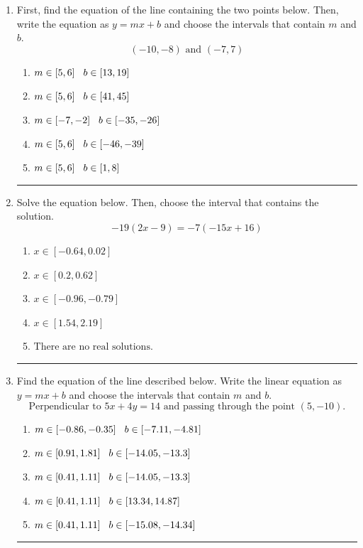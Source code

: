 \documentclass[14pt]{extbook}
\newcommand{\litem}[1]{\item#1\hspace*{-1cm}\rule{\textwidth}{0.4pt}}
\begin{document}
\begin{enumerate}
{\begin{enumerate}[label=\Alph*.]
\end{enumerate} }
\litem{
First, find the equation of the line containing the two points below. Then, write the equation as $ y=mx+b $ and choose the intervals that contain $m$ and $b$.\[ (-10, -8) \text{ and } (-7, 7) \]\begin{enumerate}[label=\Alph*.]
\item \( m \in [5, 6] \hspace*{3mm} b \in [13, 19] \)
\item \( m \in [5, 6] \hspace*{3mm} b \in [41, 45] \)
\item \( m \in [-7, -2] \hspace*{3mm} b \in [-35, -26] \)
\item \( m \in [5, 6] \hspace*{3mm} b \in [-46, -39] \)
\item \( m \in [5, 6] \hspace*{3mm} b \in [1, 8] \)

\end{enumerate} }
\litem{
Solve the equation below. Then, choose the interval that contains the solution.\[ -19(2x -9) = -7(-15x + 16) \]\begin{enumerate}[label=\Alph*.]
\item \( x \in [-0.64, 0.02] \)
\item \( x \in [0.2, 0.62] \)
\item \( x \in [-0.96, -0.79] \)
\item \( x \in [1.54, 2.19] \)
\item \( \text{There are no real solutions.} \)

\end{enumerate} }
\litem{
Find the equation of the line described below. Write the linear equation as $ y=mx+b $ and choose the intervals that contain $m$ and $b$.\[ \text{Perpendicular to } 5 x + 4 y = 14 \text{ and passing through the point } (5, -10). \]\begin{enumerate}[label=\Alph*.]
\item \( m \in [-0.86, -0.35] \hspace*{3mm} b \in [-7.11, -4.81] \)
\item \( m \in [0.91, 1.81] \hspace*{3mm} b \in [-14.05, -13.3] \)
\item \( m \in [0.41, 1.11] \hspace*{3mm} b \in [-14.05, -13.3] \)
\item \( m \in [0.41, 1.11] \hspace*{3mm} b \in [13.34, 14.87] \)
\item \( m \in [0.41, 1.11] \hspace*{3mm} b \in [-15.08, -14.34] \)


\end{enumerate}}
\end{enumerate}
\end{document}
